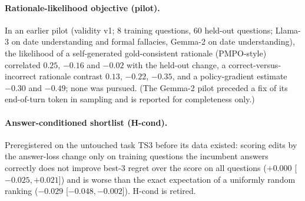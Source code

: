 \paragraph{Rationale-likelihood objective (pilot).} In an earlier pilot (validity v1; 8
training questions, 60 held-out questions; Llama-3 on date understanding and formal fallacies,
Gemma-2 on date understanding), the likelihood of a self-generated gold-consistent
rationale (PMPO-style) correlated $0.25$, $-0.16$ and $-0.02$ with the held-out change,
a correct-versus-incorrect rationale contrast $0.13$, $-0.22$, $-0.35$, and a policy-gradient
estimate $-0.30$ and $-0.49$; none was pursued. (The Gemma-2 pilot preceded a fix of its
end-of-turn token in sampling and is reported for completeness only.)

\paragraph{Answer-conditioned shortlist (H-cond).} Preregistered on the untouched task
TS3 before its data existed: scoring edits by the answer-loss change only on training questions
the incumbent answers correctly does not improve best-3 regret over the score on all questions ($+0.000$
[$-0.025,+0.021$]) and is worse than the exact expectation of a uniformly random ranking
($-0.029$ [$-0.048,-0.002$]). H-cond is retired.


